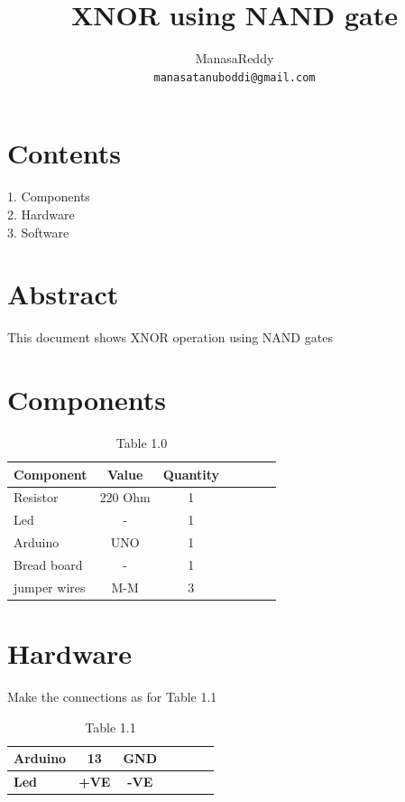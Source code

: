 \documentclass[11pt]{article}
\title{XNOR using NAND gate}
\author{ManasaReddy\\
  {\tt manasatanuboddi@gmail.com}}
\date{}
\begin{document}
\maketitle
\section{Contents}
1. Components\\
2. Hardware\\
3. Software\\
\section {Abstract}
This document shows XNOR operation using NAND gates

\section{Components}
\begin{table}[htbp]
 \begin{center}
    \begin{tabular}{|l|c|c|c|c|c|c|} \hline 
  \textbf{Component} & \textbf{Value} & \textbf{Quantity} \\
 \hline
Resistor & 220 Ohm & 1 \\ \hline
Led & - & 1\\ \hline
Arduino & UNO & 1 \\ \hline
Bread board & - & 1 \\ \hline
jumper wires& M-M& 3 \\ \hline
\end{tabular}   
\end{center}
\caption{\label{table:dummytable} Table 1.0}
\end{table}



\section{Hardware}
Make the connections as for Table 1.1
\begin{table}[htbp]
 \begin{center}
    \begin{tabular}{|l|c|c|c|c|c|c|} \hline 
 \textbf{Arduino} & \textbf{13} & \textbf{GND} \\ \hline
 \textbf{Led} & \textbf{+VE} & \textbf{-VE}\\ \hline
\end{tabular}   
\end{center}
\caption{\label{table:dummytable} Table 1.1}
\end{table}
\end{document}
